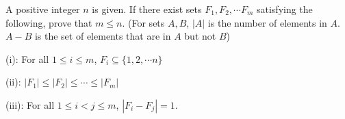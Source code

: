 A positive integer $n$ is given. If there exist sets $F_1, F_2, \cdots F_m$ satisfying the following, prove that $m \le n$.
(For sets $A, B$, $|A|$ is the number of elements in $A$. $A-B$ is the set of elements that are in $A$ but not $B$)

(i): For all $1 \le i \le m$, $F_i \subseteq \{1,2,\cdots n\}$

(ii): $|F_1| \le |F_2| \le \cdots \le |F_m|$

(iii): For all $1 \le i < j \le m$, $|F_i-F_j|=1$.